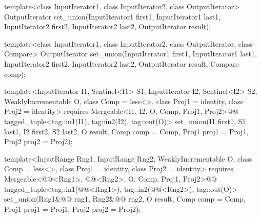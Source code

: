 %
\begin{removedblock}
\begin{itemdecl}
template<class InputIterator1, class InputIterator2,
         class OutputIterator>
  OutputIterator
    set_union(InputIterator1 first1, InputIterator1 last1,
              InputIterator2 first2, InputIterator2 last2,
              OutputIterator result);

template<class InputIterator1, class InputIterator2,
         class OutputIterator, class Compare>
  OutputIterator
    set_union(InputIterator1 first1, InputIterator1 last1,
              InputIterator2 first2, InputIterator2 last2,
              OutputIterator result, Compare comp);
\end{itemdecl}
\end{removedblock}
\begin{addedblock}
\begin{itemdecl}
template<InputIterator I1, Sentinel<I1> S1, InputIterator I2, Sentinel<I2> S2,
    WeaklyIncrementable O, class Comp = less<>, class Proj1 = identity, class Proj2 = identity>
  requires Mergeable<I1, I2, O, Comp, Proj1, Proj2>@\newtxt{()}@
  tagged_tuple<tag::in1(I1), tag::in2(I2), tag::out(O)>
    set_union(I1 first1, S1 last1, I2 first2, S2 last2, O result, Comp comp = Comp{},
              Proj1 proj1 = Proj1{}, Proj2 proj2 = Proj2{});

template<InputRange Rng1, InputRange Rng2, WeaklyIncrementable O,
    class Comp = less<>, class Proj1 = identity, class Proj2 = identity>
  requires Mergeable<@@<Rng1>, @@<Rng2>, O, Comp, Proj1, Proj2>@\newtxt{()}@
  tagged_tuple<tag::in1(@@<Rng1>),
               tag::in2(@@<Rng2>),
               tag::out(O)>
    set_union(Rng1&@\newtxt{\&}@ rng1, Rng2&@\newtxt{\&}@ rng2, O result, Comp comp = Comp{},
              Proj1 proj1 = Proj1{}, Proj2 proj2 = Proj2{});
\end{itemdecl}
\end{addedblock}

